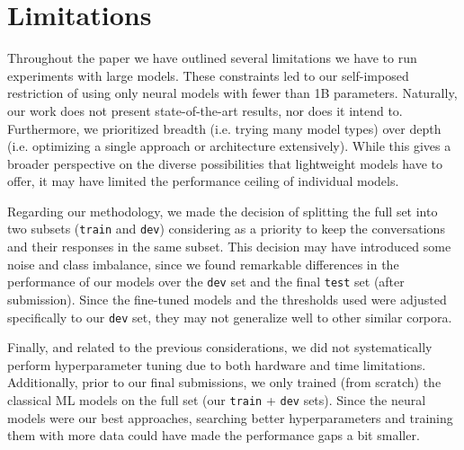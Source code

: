 \documentclass[11pt]{article}
\begin{document}
\section{Limitations}
\label{sec:limitations}

Throughout the paper we have outlined several limitations we have to run experiments with large models.
These constraints led to our self-imposed restriction of using only neural models with fewer than 1B parameters.
Naturally, our work does not present state-of-the-art results, nor does it intend to. 
Furthermore, we prioritized breadth (i.e. trying many model types) over depth (i.e. optimizing a single approach or architecture extensively). 
While this gives a broader perspective on the diverse possibilities that lightweight models have to offer, it may have limited the performance ceiling of individual models.

Regarding our methodology, we made the decision of splitting the full set into two subsets (\texttt{train} and \texttt{dev}) considering as a priority to keep the conversations and their responses in the same subset.
This decision may have introduced some noise and class imbalance, since we found remarkable differences in the performance of our models over the \texttt{dev} set and the final \texttt{test} set (after submission).
Since the fine-tuned models and the thresholds used were adjusted specifically to our \texttt{dev} set, they may not generalize well to other similar corpora. 

Finally, and related to the previous considerations, we did not systematically perform hyperparameter tuning due to both hardware and time limitations.
Additionally, prior to our final submissions, we only trained (from scratch) the classical ML models on the full set (our \texttt{train} + \texttt{dev} sets).
Since the neural models were our best approaches, searching better hyperparameters and training them with more data could have made the performance gaps a bit smaller.





% 
\end{document}
